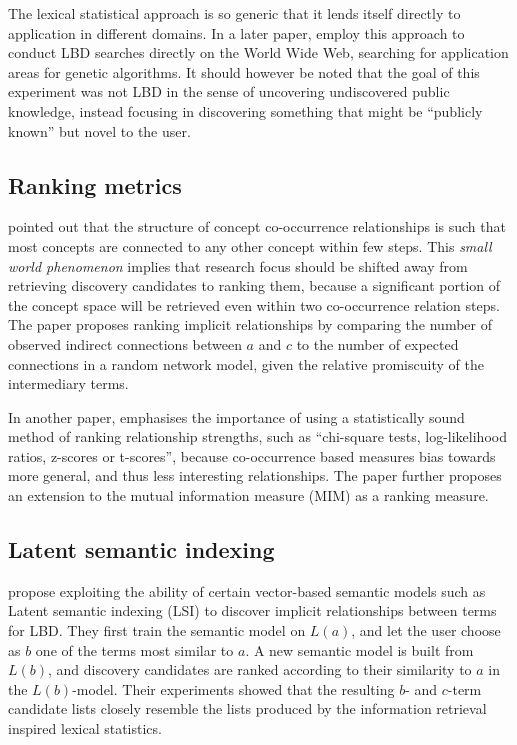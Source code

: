 The lexical statistical approach is so generic that it lends itself directly to application in different domains. In a later paper, \citet{gor01} employ this approach to conduct LBD searches directly on the World Wide Web, searching for application areas for genetic algorithms. It should however be noted that the goal of this experiment was not LBD in the sense of uncovering undiscovered public knowledge, instead focusing in discovering something that might be ``publicly known'' but novel to the user.

\subsection{Ranking metrics}
\citet{wre04a} pointed out that the structure of concept co-occurrence relationships is such that most concepts are connected to any other concept within few steps. This \emph{small world phenomenon} implies that research focus should be shifted away from retrieving discovery candidates to ranking them, because a significant portion of the concept space will be retrieved even within two co-occurrence relation steps. The paper proposes ranking implicit relationships by comparing the number of observed indirect connections between $a$ and $c$ to the number of expected connections in a random network model, given the relative promiscuity of the intermediary terms. 

In another paper, \citet{wre04b} emphasises the importance of using a statistically sound method of ranking relationship strengths, such as ``chi-square tests, log-likelihood ratios, z-scores or t-scores'', because co-occurrence based measures bias towards more general, and thus less interesting relationships. The paper further proposes an extension to the mutual information measure (MIM) as a ranking measure.

\subsection{Latent semantic indexing}
\citet{gor98} propose exploiting the ability of certain vector-based semantic models such as Latent semantic indexing (LSI) to discover implicit relationships between terms for LBD. They first train the semantic model on $L(a)$, and let the user choose as $b$ one of the terms most similar to $a$. A new semantic model is built from $L(b)$, and discovery candidates are ranked according to their similarity to $a$ in the $L(b)$-model. Their experiments showed that the resulting $b$- and $c$-term candidate lists closely resemble the lists produced by the information retrieval inspired lexical statistics. 


